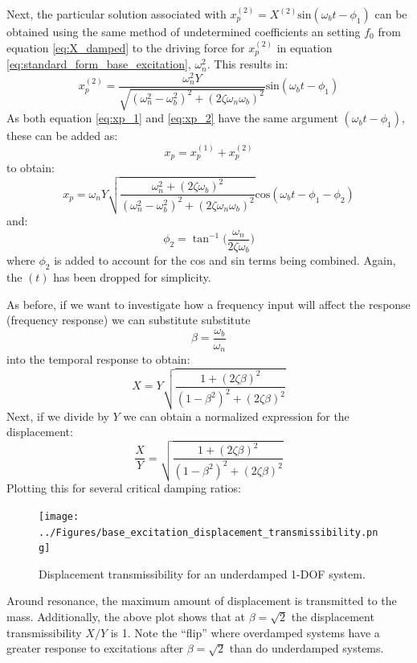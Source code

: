 \documentclass[12pt,letter]{article}
\numberwithin{ex}{section} %
\numberwithin{re}{section} %
\begin{document}
				Next, the particular solution associated with $x_p^{(2)} = X^{(2)} \text{sin}(\omega_b t - \phi_1)$ can be obtained using the same method of undetermined coefficients an setting $f_0$ from equation \ref{eq:X_damped} to the driving force for $x_p^{(2)}$ in equation  \ref{eq:standard_form_base_excitation}, $\omega_n^2$. This results in:
				\begin{equation}
					x_p^{(2)} = \frac{\omega_n^2 Y}{\sqrt{(\omega_n^2 - \omega_b^2)^2 +  (2\zeta \omega_n \omega_b)^2}}  \text{sin}(\omega_b t - \phi_1)
					\label{eq:xp_2}
				\end{equation}
				As both equation \ref{eq:xp_1} and \ref{eq:xp_2}  have the same argument $(\omega_b t - \phi_1)$, these can be added as:
				\begin{equation}
					x_p = 	x_p^{(1)} + x_p^{(2)}
				\end{equation}
				to obtain:
				\begin{equation}
					x_p = 	\omega_n Y   \sqrt{\frac{\omega_n^2 + (2 \zeta \omega_b)^2 }{(\omega_n^2 - \omega_b^2)^2 +  (2\zeta \omega_n \omega_b)^2} }  \text{cos}(\omega_bt - \phi_1 - \phi_2)
				\end{equation}
				and:
				\begin{equation}
					\phi_2 = \tan^{-1} \bigg(\frac{\omega_n}{2\zeta \omega_b}\bigg)
				\end{equation}
				where $\phi_2$ is added to account for the cos and sin terms being combined. Again, the $(t)$ has been dropped for simplicity. 
				
				As before, if we want to investigate how a frequency input will affect the response (frequency response) we can substitute substitute 
				\begin{equation}
				\beta=\frac{\omega_b}{\omega_n}
				\end{equation} 
				into the temporal response to obtain:
				\begin{equation}
				X = Y \sqrt{\frac{1+(2 \zeta \beta)^2}{(1-\beta^2)^2 + (2 \zeta \beta )^2}} 
				\end{equation} 
				Next, if we divide by $Y$ we can obtain a normalized expression for the displacement:
				\begin{equation}
				\frac{X}{Y} = \sqrt{\frac{1+(2 \zeta \beta)^2}{(1-\beta^2)^2 + (2 \zeta \beta )^2}} 
				\end{equation} 
				Plotting this for several critical damping ratios:
				\begin{figure}[H]
					\centering
					\texttt{[image: ../Figures/base\_excitation\_displacement\_transmissibility.png]}
					\caption{Displacement transmissibility for an underdamped 1-DOF system.}
				\end{figure}
				Around resonance, the maximum amount of displacement is transmitted to the mass. Additionally,  the above plot shows that at $\beta=\sqrt{2}$ the displacement transmissibility $X/Y$ is 1. Note the ``flip'' where overdamped systems have a greater response to excitations after $\beta=\sqrt{2}$ than do underdamped systems.
\end{document}
